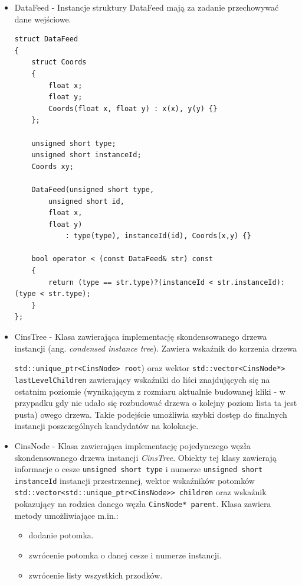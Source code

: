 \documentclass[12pt]{article}
\def\inline{\lstinline[basicstyle=\ttfamily,keywordstyle={}]}
\begin{document}
\begin{itemize}
\item DataFeed - Instancje struktury DataFeed mają za zadanie przechowywać dane wejściowe.

\begin{minipage}{\linewidth}
\begin{lstlisting}[caption={Kod struktury DataFeed}]
struct DataFeed
{
    struct Coords
    {
        float x;
        float y;
        Coords(float x, float y) : x(x), y(y) {}
    };

	unsigned short type;
	unsigned short instanceId;
	Coords xy;

	DataFeed(unsigned short type,
        unsigned short id,
        float x,
        float y)
    		: type(type), instanceId(id), Coords(x,y) {}

	bool operator < (const DataFeed& str) const
	{
		return (type == str.type)?(instanceId < str.instanceId):(type < str.type);
	}
};
\end{lstlisting}
\end{minipage}

\item CinsTree - Klasa zawierająca implementację skondensowanego drzewa instancji (ang. \textit{condensed instance tree}). Zawiera wskaźnik do korzenia drzewa \raggedright \inline{std::unique_ptr<CinsNode> root}) oraz wektor \inline{std::vector<CinsNode*> lastLevelChildren} zawierający wskaźniki do liści znajdujących się na ostatnim poziomie (wynikającym z rozmiaru aktualnie budowanej kliki - w przypadku gdy nie udało się rozbudować drzewa o kolejny poziom lista ta jest pusta) owego drzewa. Takie podejście umożliwia szybki dostęp do finalnych instancji poszczególnych kandydatów na kolokacje.

\item CinsNode - Klasa zawierająca implementację pojedynczego węzła skondensowanego drzewa instancji \textit{CinsTree}. Obiekty tej klasy zawierają informacje o cesze \inline{unsigned short type} i numerze \inline{unsigned short instanceId} instancji przestrzennej, wektor wskaźników potomków \inline{std::vector<std::unique_ptr<CinsNode>> children} oraz wskaźnik pokazujący na rodzica danego węzła \inline{CinsNode* parent}. Klasa zawiera metody umożliwiające m.in.:

\begin{itemize}
\item dodanie potomka.
\item zwrócenie potomka o danej cesze i numerze instancji.
\item zwrócenie listy wszystkich przodków.
\end{itemize}


\end{itemize}
\end{document}
